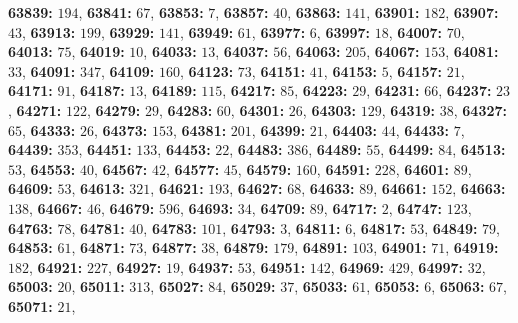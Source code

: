 \textsf{\bfseries 63839:} $194$, \textsf{\bfseries 63841:} $67$, \textsf{\bfseries 63853:} $7$, \textsf{\bfseries 63857:} $40$, \textsf{\bfseries 63863:} $141$, \textsf{\bfseries 63901:} $182$, \textsf{\bfseries 63907:} $43$, \textsf{\bfseries 63913:} $199$, \textsf{\bfseries 63929:} $141$, \textsf{\bfseries 63949:} $61$, \textsf{\bfseries 63977:} $6$, \textsf{\bfseries 63997:} $18$, \textsf{\bfseries 64007:} $70$, \textsf{\bfseries 64013:} $75$, \textsf{\bfseries 64019:} $10$, \textsf{\bfseries 64033:} $13$, \textsf{\bfseries 64037:} $56$, \textsf{\bfseries 64063:} $205$, \textsf{\bfseries 64067:} $153$, \textsf{\bfseries 64081:} $33$, \textsf{\bfseries 64091:} $347$, \textsf{\bfseries 64109:} $160$, \textsf{\bfseries 64123:} $73$, \textsf{\bfseries 64151:} $41$, \textsf{\bfseries 64153:} $5$, \textsf{\bfseries 64157:} $21$, \textsf{\bfseries 64171:} $91$, \textsf{\bfseries 64187:} $13$, \textsf{\bfseries 64189:} $115$, \textsf{\bfseries 64217:} $85$, \textsf{\bfseries 64223:} $29$, \textsf{\bfseries 64231:} $66$, \textsf{\bfseries 64237:} $23$, \textsf{\bfseries 64271:} $122$, \textsf{\bfseries 64279:} $29$, \textsf{\bfseries 64283:} $60$, \textsf{\bfseries 64301:} $26$, \textsf{\bfseries 64303:} $129$, \textsf{\bfseries 64319:} $38$, \textsf{\bfseries 64327:} $65$, \textsf{\bfseries 64333:} $26$, \textsf{\bfseries 64373:} $153$, \textsf{\bfseries 64381:} $201$, \textsf{\bfseries 64399:} $21$, \textsf{\bfseries 64403:} $44$, \textsf{\bfseries 64433:} $7$, \textsf{\bfseries 64439:} $353$, \textsf{\bfseries 64451:} $133$, \textsf{\bfseries 64453:} $22$, \textsf{\bfseries 64483:} $386$, \textsf{\bfseries 64489:} $55$, \textsf{\bfseries 64499:} $84$, \textsf{\bfseries 64513:} $53$, \textsf{\bfseries 64553:} $40$, \textsf{\bfseries 64567:} $42$, \textsf{\bfseries 64577:} $45$, \textsf{\bfseries 64579:} $160$, \textsf{\bfseries 64591:} $228$, \textsf{\bfseries 64601:} $89$, \textsf{\bfseries 64609:} $53$, \textsf{\bfseries 64613:} $321$, \textsf{\bfseries 64621:} $193$, \textsf{\bfseries 64627:} $68$, \textsf{\bfseries 64633:} $89$, \textsf{\bfseries 64661:} $152$, \textsf{\bfseries 64663:} $138$, \textsf{\bfseries 64667:} $46$, \textsf{\bfseries 64679:} $596$, \textsf{\bfseries 64693:} $34$, \textsf{\bfseries 64709:} $89$, \textsf{\bfseries 64717:} $2$, \textsf{\bfseries 64747:} $123$, \textsf{\bfseries 64763:} $78$, \textsf{\bfseries 64781:} $40$, \textsf{\bfseries 64783:} $101$, \textsf{\bfseries 64793:} $3$, \textsf{\bfseries 64811:} $6$, \textsf{\bfseries 64817:} $53$, \textsf{\bfseries 64849:} $79$, \textsf{\bfseries 64853:} $61$, \textsf{\bfseries 64871:} $73$, \textsf{\bfseries 64877:} $38$, \textsf{\bfseries 64879:} $179$, \textsf{\bfseries 64891:} $103$, \textsf{\bfseries 64901:} $71$, \textsf{\bfseries 64919:} $182$, \textsf{\bfseries 64921:} $227$, \textsf{\bfseries 64927:} $19$, \textsf{\bfseries 64937:} $53$, \textsf{\bfseries 64951:} $142$, \textsf{\bfseries 64969:} $429$, \textsf{\bfseries 64997:} $32$, \textsf{\bfseries 65003:} $20$, \textsf{\bfseries 65011:} $313$, \textsf{\bfseries 65027:} $84$, \textsf{\bfseries 65029:} $37$, \textsf{\bfseries 65033:} $61$, \textsf{\bfseries 65053:} $6$, \textsf{\bfseries 65063:} $67$, \textsf{\bfseries 65071:} $21$, 

